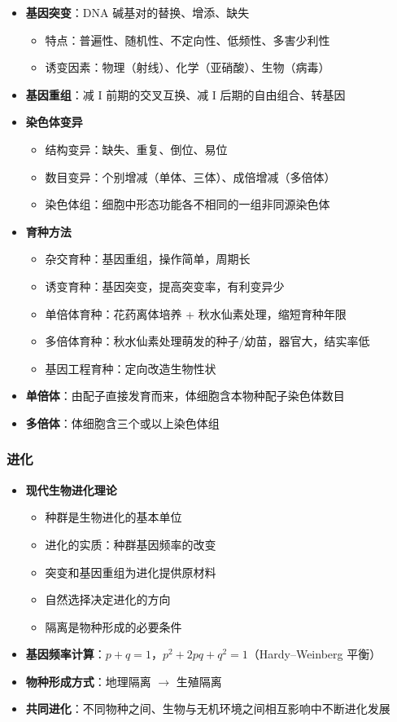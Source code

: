 \begin{itemize}
  \item \textbf{基因突变}：DNA 碱基对的替换、增添、缺失
  \begin{itemize}
    \item 特点：普遍性、随机性、不定向性、低频性、多害少利性
    \item 诱变因素：物理（射线）、化学（亚硝酸）、生物（病毒）
  \end{itemize}
  \item \textbf{基因重组}：减 I 前期的交叉互换、减 I 后期的自由组合、转基因
  \item \textbf{染色体变异}
  \begin{itemize}
    \item 结构变异：缺失、重复、倒位、易位
    \item 数目变异：个别增减（单体、三体）、成倍增减（多倍体）
    \item 染色体组：细胞中形态功能各不相同的一组非同源染色体
  \end{itemize}
  \item \textbf{育种方法}
  \begin{itemize}
    \item 杂交育种：基因重组，操作简单，周期长
    \item 诱变育种：基因突变，提高突变率，有利变异少
    \item 单倍体育种：花药离体培养 + 秋水仙素处理，缩短育种年限
    \item 多倍体育种：秋水仙素处理萌发的种子/幼苗，器官大，结实率低
    \item 基因工程育种：定向改造生物性状
  \end{itemize}
  \item \textbf{单倍体}：由配子直接发育而来，体细胞含本物种配子染色体数目
  \item \textbf{多倍体}：体细胞含三个或以上染色体组
\end{itemize}

\subsubsection{进化}

\begin{itemize}
  \item \textbf{现代生物进化理论}
  \begin{itemize}
    \item 种群是生物进化的基本单位
    \item 进化的实质：种群基因频率的改变
    \item 突变和基因重组为进化提供原材料
    \item 自然选择决定进化的方向
    \item 隔离是物种形成的必要条件
  \end{itemize}
  \item \textbf{基因频率计算}：$p+q=1$，$p^2+2pq+q^2=1$（Hardy--Weinberg 平衡）
  \item \textbf{物种形成方式}：地理隔离 $\to$ 生殖隔离
  \item \textbf{共同进化}：不同物种之间、生物与无机环境之间相互影响中不断进化发展
\end{itemize}

